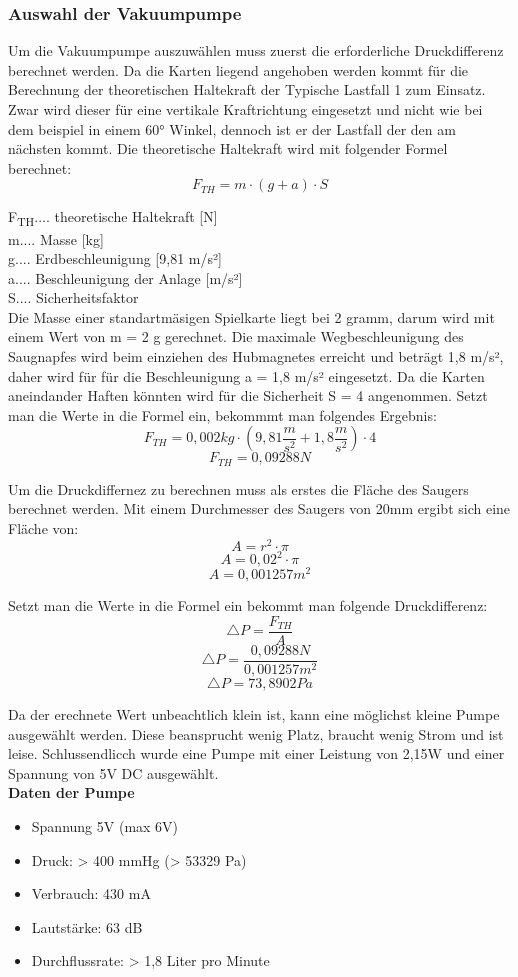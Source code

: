 \subsubsection{Auswahl der Vakuumpumpe}
Um die Vakuumpumpe auszuwählen muss zuerst die erforderliche Druckdifferenz berechnet werden.
Da die Karten liegend angehoben werden kommt für die Berechnung der theoretischen Haltekraft der Typische Lastfall 1
zum Einsatz. Zwar wird dieser für eine vertikale Kraftrichtung eingesetzt und nicht wie bei dem beispiel in einem
60° Winkel, dennoch ist er der Lastfall der den am nächsten kommt.
Die theoretische Haltekraft wird mit folgender Formel berechnet:
\begin{equation}
    F_{TH} = m \cdot (g + a) \cdot S
\end{equation}

    F\textsubscript{TH}.... theoretische Haltekraft [N] \\
    m.... Masse [kg]\\
    g.... Erdbeschleunigung [9,81 m/s²]\\
   a.... Beschleunigung der Anlage [m/s²]\\
    S.... Sicherheitsfaktor \\

Die Masse einer standartmäsigen Spielkarte liegt bei 2 gramm, darum wird mit einem Wert von m = 2 g gerechnet.
Die maximale Wegbeschleunigung des Saugnapfes wird  beim einziehen des Hubmagnetes erreicht und
beträgt 1,8 m/s²,
daher wird für für die Beschleunigung a = 1,8 m/s² eingesetzt. Da die Karten aneindander Haften könnten
wird für die Sicherheit S = 4 angenommen.
Setzt man die Werte in die Formel ein, bekommmt man folgendes Ergebnis: \\
\[F_{TH}=0,002kg\cdot (9,81\frac{m}{s^{2}}+1,8\frac{m}{s^{2}})\cdot 4\]
\[F_{TH}= 0,09288N\]

Um die Druckdiffernez zu berechnen muss als erstes die Fläche des Saugers berechnet werden.
Mit einem Durchmesser des Saugers von 20mm ergibt sich eine Fläche von:
\[A=r^{2}\cdot \pi\]
\[A=0,02^{2}\cdot \pi\]
\[A=0,001257m^{2}\]

Setzt man die Werte in die Formel ein bekommt man folgende Druckdifferenz:
\[\triangle P=\frac{F_{TH}}{A}\]
\[\triangle P=\frac{0,09288N}{0,001257m^{2}}\]
\[\triangle P=73,8902Pa\]

Da der erechnete Wert unbeachtlich klein ist, kann eine möglichst kleine Pumpe ausgewählt werden. Diese beansprucht
wenig Platz, braucht wenig Strom und ist leise. Schlussendlicch wurde eine Pumpe mit einer Leistung von 2,15W und einer
Spannung von 5V DC ausgewählt.\\
\textbf{Daten der Pumpe}
\begin{itemize}
    \item Spannung 5V (max 6V)
    \item Druck: > 400 mmHg (> 53329 Pa)
    \item Verbrauch: 430 mA
    \item Lautstärke: 63 dB
    \item Durchflussrate: > 1,8 Liter pro Minute
\end{itemize}



